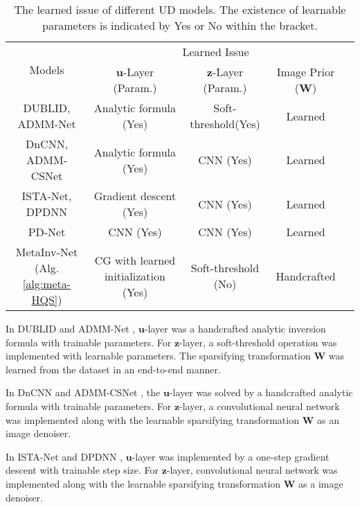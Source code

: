 \documentclass[journal,twoside]{IEEEtran}
\newcommand{\myfontNew}{\fontsize{9pt}{\baselineskip}\selectfont}
\begin{document}
\begin{table*}[t]
  \myfontNew
  \caption{ The learned issue of different UD models.  The existence of learnable parameters is indicated by Yes or No within the bracket.
  }  \label{table:diff-UDs-models}
\centering
  \begin{tabular}{|c|c|c|c|c|}
  \hline
  \multirow{2}{*}{ Models } & \multicolumn{3}{c|}{Learned Issue}\\
\cline{2-4}
 & \multicolumn{1}{c|}{$\bm{u}$-Layer (Param.) } & \multicolumn{1}{c|}{$\bm{z}$-Layer (Param.)  } & Image Prior ($\bm{W}$) \\
  \cline{1-4}
  DUBLID\cite{li2020efficient}, ADMM-Net\cite{yang2016deep} & Analytic formula (Yes) & Soft-threshold(Yes) & Learned  \\
  \cline{1-4}
  DnCNN\cite{zhang2017learning}, ADMM-CSNet\cite{yang2020admm-csnet} & Analytic formula (Yes) & CNN (Yes) & Learned \\
  \cline{1-4}
  ISTA-Net\cite{zhang2018ista-net}, DPDNN\cite{dong2019denoising} & Gradient descent (Yes) & CNN (Yes)  &Learned \\
  \cline{1-4}
  PD-Net\cite{adler2018learned} & CNN (Yes) & CNN (Yes) & Learned \\
  \cline{1-4}
  MetaInv-Net (Alg.\ref{alg:meta-HQS}) & CG with learned initialization (Yes) & Soft-threshold (No) &Handcrafted \\
  \cline{1-4}
\hline
\end{tabular}
\end{table*}

In DUBLID\cite{li2020efficient} and ADMM-Net \cite{yang2016deep}, $\bm{u}$-layer was a handcrafted analytic inversion formula with trainable parameters. For $\bm{z}$-layer, a soft-threshold operation was implemented with learnable parameters. The sparsifying transformation $\bm{W}$ was learned from the dataset in an end-to-end manner. 

In DnCNN \cite{zhang2017learning} and ADMM-CSNet \cite{yang2020admm-csnet}, the $\bm{u}$-layer was solved by a handcrafted analytic formula with trainable parameters. For $\bm{z}$-layer, a convolutional neural network was implemented along with the learnable sparsifying transformation $\bm{W}$ as an image denoiser.

In ISTA-Net \cite{zhang2018ista-net} and DPDNN  \cite{dong2019denoising}, $\bm{u}$-layer was implemented by a one-step gradient descent with trainable step size. For $\bm{z}$-layer, convolutional neural network was implemented along with the learnable sparsifying transformation $\bm{W}$ as a image denoiser.
\end{document}
